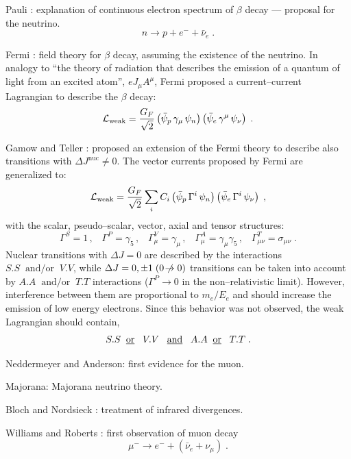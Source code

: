 \documentclass[12pt]{report}
\newcommand{\slb}[1]{\textbf{\textsl{#1}}}
\newcommand{\nin}{\noindent}
\def\text#1{{\scriptstyle\mathrm{#1}}}
\newcommand{\gc}{\gamma_5}
\newcommand{\g}{\gamma}
\newcommand{\lag}{{\cal L}}
\begin{document}
\nin
\fbox{\slb{1934}} Pauli \cite{Pauli:34}: explanation of continuous electron
spectrum of $\beta$ decay --- proposal for the neutrino.
\[
n \to p + e^- + {\bar{\nu}_e} \; .
\]

\nin
\fbox{\slb{1934}} Fermi \cite{Fermi:34}: field theory for $\beta$
decay, assuming the existence of the neutrino. In analogy to ``the
theory of radiation that describes the emission of a quantum of light
from an excited atom'', $e J_\mu A^\mu$, Fermi proposed a
current--current Lagrangian to describe the $\beta$ decay:
\[ 
\lag_{\text{weak}} = \frac{G_F}{\sqrt{2}}
\left( \bar{\psi}_p \, \g_\mu \, \psi_n \right)
\left( \bar{\psi}_e \, \g^\mu \, \psi_\nu \right) \; .
\]



\nin
\fbox{\slb{1936}} Gamow and Teller \cite{Gamow:36}: proposed an
extension of the Fermi theory to describe also transitions with
$\Delta J^{\text{nuc}} \neq 0$. The vector currents proposed by Fermi
are generalized to:
\[
\lag_{\text{weak}} = \frac{G_F}{\sqrt{2}}
\sum_i C_i \left( \bar{\psi}_p \, \Gamma^i \, \psi_n \right)
\left( \bar{\psi}_e \, \Gamma^i \, \psi_\nu \right) \; ,
\]
with the scalar, pseudo--scalar, vector, axial and tensor structures:
\[
\Gamma^S = 1  \, , \;\;\;   
\Gamma^P = \gc \, , \;\;\;   
\Gamma^V_\mu = \g_\mu \, , \;\;\;   
\Gamma^A_\mu = \g_\mu \gc \, , \;\;\;   
\Gamma^T_{\mu\nu} = \sigma_{\mu\nu} \; .
\]
Nuclear transitions with $\Delta J = 0$ are described by the
interactions $S.S \;\; \mbox{and/or} \;\; V.V$, while $\Delta J = 0,
\pm 1 \; (0 \not \! \to 0)$ transitions can be taken into account by
$A.A \;\; \mbox{and/or} \;\; T.T$ interactions ($\Gamma^P \to 0$ in
the non--relativistic limit).  However, interference between them are
proportional to $m_e/E_e$ and should increase the emission of low energy
electrons. Since this behavior was not observed, the weak Lagrangian
should contain, 
\[
S.S \;\; \mbox{\underline{or}} \;\;\; V.V  \;\;\;
\mbox{\underline{and}} \;\;\; 
A.A \;\; \mbox{\underline{or}} \;\;\; T.T \; .
\]

\nin
\fbox{\slb{1937}} Neddermeyer and Anderson: first evidence for the muon.

\nin
\fbox{\slb{1937}} Majorana: Majorana neutrino theory.

\nin
\fbox{\slb{1937}} Bloch and Nordsieck \cite{Block:37}: treatment of
infrared divergences.

\nin
\fbox{\slb{1940}} Williams and Roberts \cite{Williams:40}: first
observation of muon decay
\[
\mu^- \to e^- + (\bar{\nu}_e + \nu_\mu) \; .
\]
\end{document}
